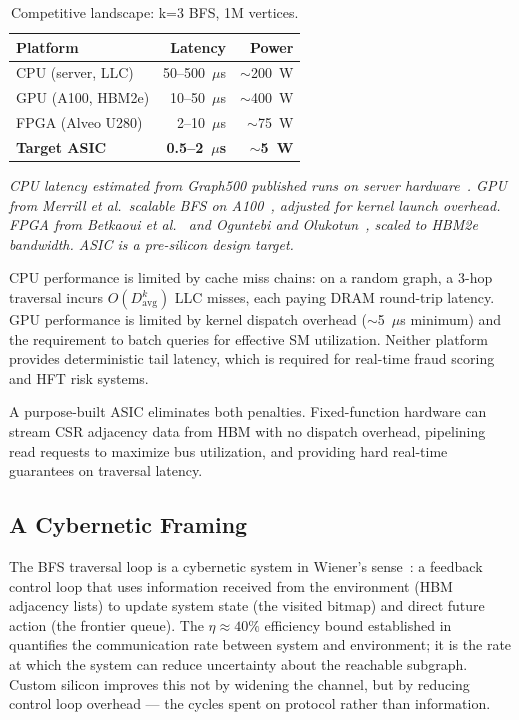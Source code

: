 \begin{table}[h]
\centering
\caption{Competitive landscape: k=3 BFS, 1M vertices.}
\label{tab:competitive}
\small
\begin{tabular}{@{}lrr@{}}
\toprule
Platform           & Latency        & Power \\
\midrule
CPU (server, LLC)  & 50--500~$\mu$s & $\sim$200~W \\
GPU (A100, HBM2e)  & 10--50~$\mu$s  & $\sim$400~W \\
FPGA (Alveo U280)  & 2--10~$\mu$s   & $\sim$75~W  \\
\textbf{Target ASIC} & \textbf{0.5--2~$\mu$s} & \textbf{$\sim$5~W} \\
\bottomrule
\end{tabular}
\vspace{3pt}
\begin{minipage}{\linewidth}
\footnotesize\textit{CPU latency estimated from Graph500 published runs on server
hardware~\cite{graph500}. GPU from Merrill et al.\ scalable BFS on A100~\cite{merrill2012scalable},
adjusted for kernel launch overhead. FPGA from Betkaoui et al.~\cite{betkaoui2012reconfigurable}
and Oguntebi and Olukotun~\cite{oguntebi2016graphops}, scaled to HBM2e bandwidth.
ASIC is a pre-silicon design target.}
\end{minipage}
\end{table}

CPU performance is limited by cache miss chains: on a random graph, a 3-hop traversal
incurs $O(D_\text{avg}^k)$ LLC misses, each paying DRAM round-trip latency.
GPU performance is limited by kernel dispatch overhead ($\sim$5~$\mu$s minimum) and the
requirement to batch queries for effective SM utilization.
Neither platform provides deterministic tail latency, which is required for real-time
fraud scoring and HFT risk systems.

A purpose-built ASIC eliminates both penalties. Fixed-function hardware can stream CSR
adjacency data from HBM with no dispatch overhead, pipelining read requests to maximize
bus utilization, and providing hard real-time guarantees on traversal latency.

\subsection{A Cybernetic Framing}

The BFS traversal loop is a cybernetic system in Wiener's sense~\cite{wiener1948cybernetics}:
a feedback control loop that uses information received from the environment (HBM adjacency
lists) to update system state (the visited bitmap) and direct future action (the frontier
queue). The $\eta \approx 40\%$ efficiency bound established in~\cite{fritz2026rmwwall}
quantifies the communication rate between system and environment; it is the rate at which
the system can reduce uncertainty about the reachable subgraph. Custom silicon improves
this not by widening the channel, but by reducing control loop overhead --- the cycles
spent on protocol rather than information.

